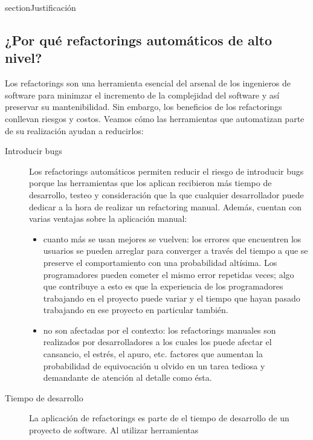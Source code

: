 section{Justificación}
\subsection{¿Por qué refactorings automáticos de alto nivel?}

Los refactorings son una herramienta esencial del arsenal de los ingenieros de
software para minimzar el incremento de la complejidad del software y así
preservar su mantenibilidad. Sin embargo, los beneficios de los refactorings
conllevan riesgos y costos. Veamos cómo las herramientas que automatizan parte
de su realización ayudan a reducirlos:

\begin{description}
    \item[Introducir bugs] Los refactorings automáticos permiten reducir el
      riesgo de introducir bugs porque las herramientas que los aplican
      recibieron más tiempo de desarrollo, testeo y consideración que la que
      cualquier desarrollador puede dedicar a la hora de realizar un refactoring
      manual. Además, cuentan con varias ventajas sobre la aplicación manual:
        \begin{itemize}
            \item cuanto más se usan mejores se vuelven: los errores que encuentren los
            usuarios se pueden arreglar para converger a través del tiempo a que
            se preserve el comportamiento con una probabilidad altísima. Los
            programadores pueden cometer el mismo error repetidas veces; algo que
            contribuye a esto es que la experiencia de los programadores trabajando en
            el proyecto puede variar y el tiempo que hayan pasado trabajando en ese
            proyecto en particular también.
            \item no son afectadas por el contexto: los refactorings manuales son
            realizados por desarrolladores a los cuales los puede afectar el
            cansancio, el estrés, el apuro, etc. factores que aumentan la probabilidad
            de equivocación u olvido en un tarea tediosa y demandante de atención al
            detalle como ésta.
        \end{itemize}
    \item[Tiempo de desarrollo] La aplicación de refactorings es parte de el
      tiempo de desarrollo de un proyecto de software. Al utilizar herramientas

\end{description}
